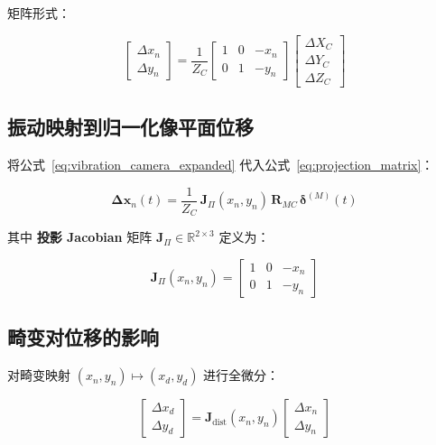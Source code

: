 \documentclass[12pt,a4paper]{article}
\begin{document}
矩阵形式：

\begin{equation}
\begin{bmatrix} \Delta x_n \\ \Delta y_n \end{bmatrix}
=
\frac{1}{Z_C}
\begin{bmatrix}
1 & 0 & -x_n \\
0 & 1 & -y_n
\end{bmatrix}
\begin{bmatrix}
\Delta X_C \\ \Delta Y_C \\ \Delta Z_C
\end{bmatrix}
\label{eq:projection_matrix}
\end{equation}

\subsection{振动映射到归一化像平面位移}

将公式~\eqref{eq:vibration_camera_expanded} 代入公式~\eqref{eq:projection_matrix}：

\begin{equation}
\boxed{
\mathbf{\Delta} \mathbf{x}_n(t)
=
\frac{1}{Z_C}
\,
\mathbf{J}_{\Pi}(x_n, y_n)
\,
\mathbf{R}_{MC}
\,
\boldsymbol{\delta}^{(M)}(t)
}
\label{eq:vibration_to_normalized}
\end{equation}

其中 \textbf{投影 Jacobian} 矩阵 $\mathbf{J}_{\Pi} \in \mathbb{R}^{2 \times 3}$ 定义为：

\begin{equation}
\mathbf{J}_{\Pi}(x_n, y_n)
=
\begin{bmatrix}
1 & 0 & -x_n \\
0 & 1 & -y_n
\end{bmatrix}
\label{eq:projection_jacobian}
\end{equation}

\subsection{畸变对位移的影响}

对畸变映射 $(x_n, y_n) \mapsto (x_d, y_d)$ 进行全微分：

\begin{equation}
\begin{bmatrix} \Delta x_d \\ \Delta y_d \end{bmatrix}
=
\mathbf{J}_{\text{dist}}(x_n, y_n)
\begin{bmatrix} \Delta x_n \\ \Delta y_n \end{bmatrix}
\label{eq:distortion_differential}
\end{equation}
\end{document}
